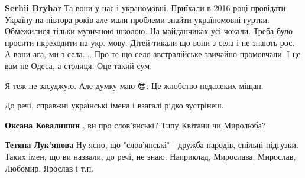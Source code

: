 \begin{itemize}
\begin{itemize}
\textbf{Serhii Bryhar} Та вони у нас і украномовні. Приїхали в 2016 році
провідати Україну на півтора років але мали проблеми знайти україномовні
гуртки. Обмежилися тільки музичною школою. На майданчиках усі чокали. Треба
було просити пкреходити на укр. мову. Дітей тикали що вони з села і не знають
рос. А вони ага, ми з села.... Про те що село австралійське звичайно
промовчали. І це вам не Одеса, а столиця. Оце такий сум.
\end{itemize}

 
Я теж не засуджую. Але думку маю 😎. Це жлобство недалеких міщан. \Smiley[1.0][yellow]

 
До речі, справжні українські імена і взагалі рідко зустрінеш.

\begin{itemize}
 
\textbf{Оксана Ковалишин} , ви про слов'янські? Типу Квітани чи Миролюба?

 
\textbf{Тетяна Лук'янова} Ну ясно, що "слов'янські" - дружба народів, спільні
підгузки. Таких імен, що ви назвали, до речі, не знаю. Наприклад, Мирослава,
Мирослав, Любомир, Ярослав і т.п.

 

\end{itemize}
\end{itemize}
